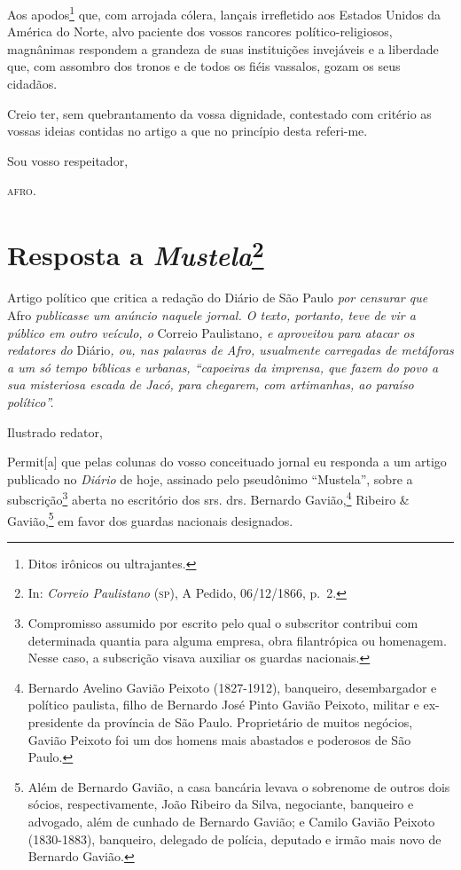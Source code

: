 Aos apodos\footnote{Ditos irônicos ou ultrajantes.} que, com arrojada
cólera, lançais irrefletido aos Estados Unidos da América do Norte, alvo
paciente dos vossos rancores político-religiosos, magnânimas respondem a
grandeza de suas instituições invejáveis e a liberdade que, com assombro
dos tronos e de todos os fiéis vassalos, gozam os seus cidadãos.

Creio ter, sem quebrantamento da vossa dignidade, contestado com
critério as vossas ideias contidas no artigo a que no princípio desta
referi-me.

Sou vosso respeitador,
\begin{flushright}
\textsc{afro}.
\end{flushright}
\chapter{Resposta a \emph{Mustela}\footnote{In: \emph{Correio Paulistano} (\textsc{sp}), A Pedido, 06/12/1866, p.~2.}}

\begin{didascalia}
Artigo político que critica a redação do Diário de São Paulo \emph{por
censurar que} Afro \emph{publicasse um anúncio naquele jornal. O texto,
portanto, teve de vir a público em outro veículo, o} Correio
Paulistano\emph{, e aproveitou para atacar os redatores do}
Diário\emph{, ou, nas palavras de Afro, usualmente carregadas de
metáforas a um só tempo bíblicas e urbanas, ``capoeiras da imprensa, que
fazem do povo a sua misteriosa escada de Jacó, para chegarem, com
artimanhas, ao paraíso político''.}
\end{didascalia}



Ilustrado redator,

Permit{[}a{]} que pelas colunas do vosso conceituado jornal eu responda
a um artigo publicado no \emph{Diário} de hoje, assinado pelo pseudônimo
``Mustela'', sobre a subscrição\footnote{Compromisso assumido por
  escrito pelo qual o subscritor contribui com determinada quantia para
  alguma empresa, obra filantrópica ou homenagem. Nesse caso, a
  subscrição visava auxiliar os guardas nacionais.} aberta no escritório
dos srs. drs. Bernardo Gavião,\footnote{Bernardo Avelino Gavião Peixoto
  (1827-1912), banqueiro, desembargador e político paulista, filho de
  Bernardo José Pinto Gavião Peixoto, militar e ex-presidente da
  província de São Paulo. Proprietário de muitos negócios, Gavião
  Peixoto foi um dos homens mais abastados e poderosos de São Paulo.}
Ribeiro \& Gavião,\footnote{Além de Bernardo Gavião, a casa bancária
  levava o sobrenome de outros dois sócios, respectivamente, João
  Ribeiro da Silva, negociante, banqueiro e advogado, além de cunhado de
  Bernardo Gavião; e Camilo Gavião Peixoto (1830-1883), banqueiro,
  delegado de polícia, deputado e irmão mais novo de Bernardo Gavião.}
em favor dos guardas nacionais designados.

